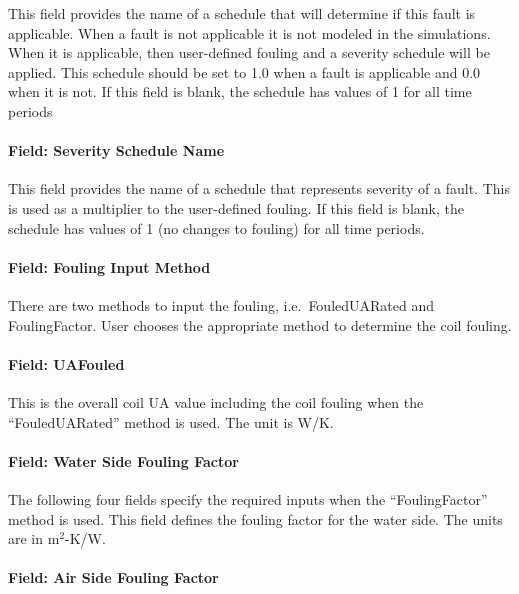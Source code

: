 This field provides the name of a schedule that will determine if this fault is applicable. When a fault is not applicable it is not modeled in the simulations. When it is applicable, then user-defined fouling and a severity schedule will be applied. This schedule should be set to 1.0 when a fault is applicable and 0.0 when it is not. If this field is blank, the schedule has values of 1 for all time periods

\paragraph{Field: Severity Schedule Name}\label{field-severity-schedule-name-5}

This field provides the name of a schedule that represents severity of a fault. This is used as a multiplier to the user-defined fouling. If this field is blank, the schedule has values of 1 (no changes to fouling) for all time periods.

\paragraph{Field: Fouling Input Method}\label{field-fouling-input-method}

There are two methods to input the fouling, i.e.~FouledUARated and FoulingFactor. User chooses the appropriate method to determine the coil fouling.

\paragraph{Field: UAFouled}\label{field-uafouled}

This is the overall coil UA value including the coil fouling when the ``FouledUARated'' method is used. The unit is W/K.

\paragraph{Field: Water Side Fouling Factor}\label{field-water-side-fouling-factor}

The following four fields specify the required inputs when the ``FoulingFactor'' method is used. This field defines the fouling factor for the water side. The units are in m\(^{2}\)-K/W.

\paragraph{Field: Air Side Fouling Factor}\label{field-air-side-fouling-factor}

